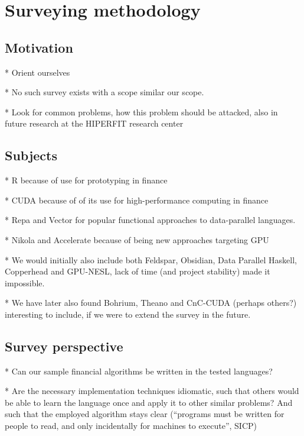 \chapter{Surveying methodology}

\section{Motivation}

* Orient ourselves

* No such survey exists with a scope similar our scope.

* Look for common problems, how this problem should be attacked, also
  in future research at the HIPERFIT research center

\section{Subjects}

* R because of use for prototyping in finance

* CUDA because of of its use for high-performance computing in finance

* Repa and Vector for popular functional approaches to data-parallel languages.

* Nikola and Accelerate because of being new approaches targeting GPU

* We would initially also include both Feldspar, Obsidian, Data
  Parallel Haskell, Copperhead and GPU-NESL, lack of time (and project stability) made it impossible.

* We have later also found Bohrium, Theano and CnC-CUDA (perhaps others?)
  interesting to include, if we were to extend the survey in the future.

\section{Survey perspective} %

* Can our sample financial algorithms be written in the tested languages?

* Are the necessary implementation techniques idiomatic, such that
  others would be able to learn the language once and apply it to other
  similar problems? And such that the employed algorithm stays clear
  (``programs must be written for people to read, and only incidentally
     for machines to execute'', SICP)

